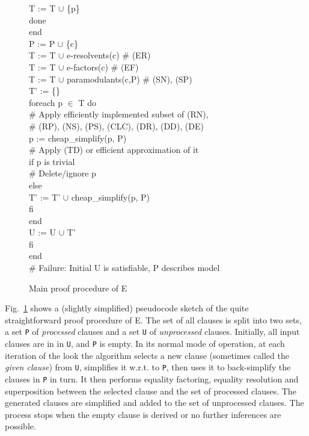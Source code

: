 \documentclass{report}
\begin{document}
\begin{figure}[hp]
\begin{center}
\begin{tabbing}
              T := T $\cup$ \{p\}\-\\
            done\-\\
          end\\
          P := P $\cup$ \{c\}\\
          T := T $\cup$ e-resolvents(c)    \# (ER)\\
          T := T $\cup$ e-factors(c)       \# (EF)\\
          T := T $\cup$ paramodulants(c,P) \# (SN), (SP)\\
          T' := \{\}\\
          foreach p $\in$ T do\+\\
            \# Apply efficiently implemented subset of (RN),\\
            \# (RP), (NS), (PS), (CLC), (DR), (DD), (DE)\\
            p := cheap\_simplify(p, P)\\
            \# Apply (TD) or efficient approximation of it\\
            if p is trivial\+\\
              \# Delete/ignore p\-\\
            else\+\\
               T' := T' $\cup$ cheap\_simplify(p, P)\-\\
            fi\-\\
          end\\
          U := U $\cup$ T' \-\\
        fi\-\\
      end\\
      \# Failure: Initial U is satisfiable, P describes model
    \end{tabbing}
    \normalfont
    \caption{Main proof procedure of E}
    \label{fig:procedure}
  \end{center}
\end{figure}

Fig.~\ref{fig:procedure} shows a (slightly simplified) pseudocode
sketch of the quite straightforward proof procedure of E. The set of
all clauses is split into two sets, a set \texttt{P} of
\emph{processed} clauses and a set \texttt{U} of \emph{unprocessed}
clauses. Initially, all input clauses are in in \texttt{U}, and
\texttt{P} is empty. In its normal mode of operation, at each
iteration of the look the algorithm selects a new clause (sometimes
called the \emph{given clause}) from \texttt{U},
simplifies it w.r.t. to \texttt{P}, then uses it to back-simplify the
clauses in \texttt{P} in turn. It then performs equality factoring,
equality resolution and superposition between the selected clause and
the set of processed clauses. The generated clauses are simplified and
added to the set of unprocessed clauses. The process stops when the
empty clause is derived or no further inferences are possible.
\end{document}
